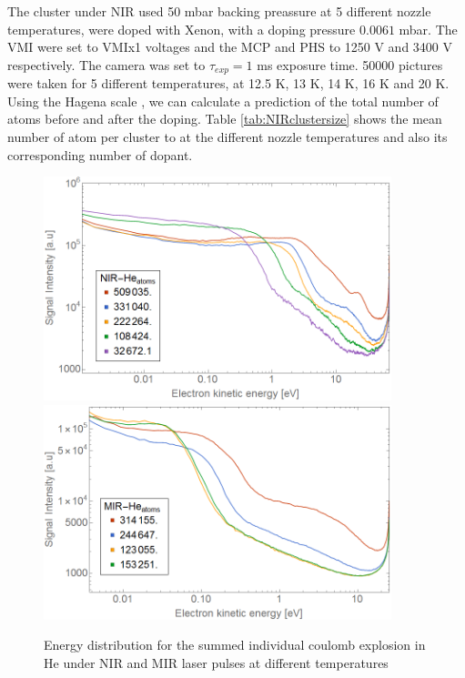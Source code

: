 The cluster under NIR used 50 mbar backing preassure at 5 different nozzle temperatures, were doped with Xenon, with a doping pressure $0.0061$ mbar. The VMI were set to VMIx1 voltages and the MCP and PHS to 1250 V and 3400 V respectively. The camera was set to $\tau_{exp}=1$ ms exposure time. 50000 pictures were taken for 5 different temperatures, at 12.5 K, 13 K, 14 K, 16 K and 20 K. Using the Hagena scale \cite{hagena_cluster_1972}, we can calculate a prediction of the total number of atoms before and after the doping. Table \ref{tab:NIRclustersize} shows the  mean number of atom per cluster to at the different nozzle temperatures and also its corresponding number of dopant. 
\begin{figure}[hbtp]
\centering
\includegraphics[width=0.9\textwidth]{../Images/results/Comparison_energyDistribution/NIR_He_summed_energydist.png} \\
\includegraphics[width=0.9\textwidth]{../Images/results/Comparison_energyDistribution/MIR_He_summed_energydist.png} \\
\caption{Energy distribution for the summed individual coulomb explosion in He under NIR and MIR laser pulses at different temperatures}
\label{fig:MIR-NIrEnergssummed}
\end{figure}

